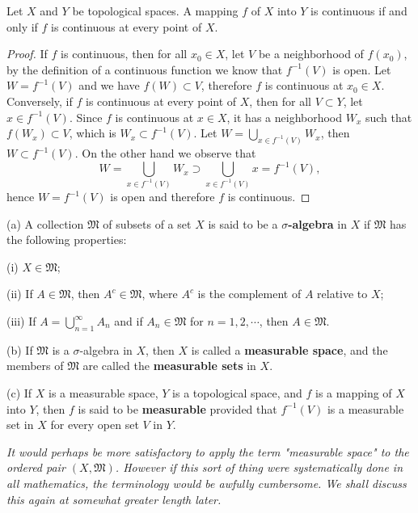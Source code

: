 \begin{proposition}
Let $X$ and $Y$ be topological spaces. A mapping $f$ of $X$ into $Y$ is continuous if and only if $f$ is continuous at every point of $X$.
\end{proposition}
\begin{proof}
If $f$ is continuous, then for all $x_0\in X$, let $V$ be a neighborhood of $f(x_0)$, by the definition of a continuous function we know that $f^{-1}(V)$ is open. Let $W=f^{-1}(V)$ and we have $f(W)\subset V$, therefore $f$ is continuous at $x_0\in X$. Conversely, if $f$ is continuous at every point of $X$, then for all $V\subset Y$, let $x\in f^{-1}(V)$. Since $f$ is continuous at $x\in X$, it has a neighborhood $W_x$ such that $f(W_x)\subset V$, which is $W_x\subset f^{-1}(V)$. Let $W=\bigcup_{x\in f^{-1}\left( V \right)}{W_x}$, then $W\subset f^{-1}(V)$. On the other hand we observe that 
$$
W=\bigcup_{x\in f^{-1}\left( V \right)}{W_x}\supset \bigcup_{x\in f^{-1}\left( V \right)}{x}=f^{-1}\left( V \right) ,
$$
hence $W=f^{-1}(V)$ is open and therefore $f$ is continuous.
\end{proof}
\begin{definition}
(a) A collection $\mathfrak{M}$ of subsets of a set $X$ is said to be a \textbf{$\sigma$-algebra} in $X$ if $\mathfrak{M}$ has the following properties:\par
\hspace{0.5cm}(i) $X\in\mathfrak{M}$;\par
\hspace{0.5cm}(ii) If $A\in\mathfrak{M}$, then $A^c\in\mathfrak{M}$, where $A^c$ is the complement of $A$ relative to $X$;\par
\hspace{0.5cm}(iii) If $A=\bigcup_{n=1}^\infty A_n$ and if $A_n\in\mathfrak{M}$ for $n=1,2,\cdots$, then $A\in\mathfrak{M}$.\par
(b) If $\mathfrak{M}$ is a $\sigma$-algebra in $X$, then $X$ is called a \textbf{measurable space}, and the members of $\mathfrak{M}$ are called the \textbf{measurable sets} in $X$.\par
(c) If $X$ is a measurable space, $Y$ is a topological space, and $f$ is a mapping of $X$ into $Y$, then $f$ is said to be \textbf{measurable} provided that $f^{-1}(V)$ is a measurable set in $X$ for every open set $V$ in $Y$.
\end{definition}
\begin{note}\em
It would perhaps be more satisfactory to apply the term "measurable space" to the ordered pair $(X,\mathfrak{M})$. However if this sort of thing were systematically done in all mathematics, the terminology would be awfully cumbersome. We shall discuss this again at somewhat greater length later.
\end{note}

